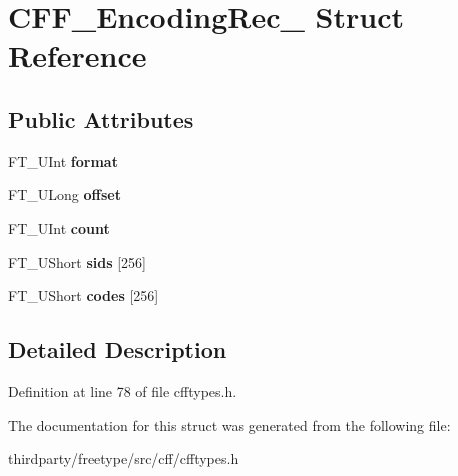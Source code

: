 \hypertarget{struct_c_f_f___encoding_rec__}{}\section{C\+F\+F\+\_\+\+Encoding\+Rec\+\_\+ Struct Reference}
\label{struct_c_f_f___encoding_rec__}
\subsection*{Public Attributes}
\begin{DoxyCompactItemize}
\item 
\mbox{\label{struct_c_f_f___encoding_rec___afa8daf27202e7173039d763587d99dff}} 
F\+T\+\_\+\+U\+Int {\bfseries format}
\item 
\mbox{\label{struct_c_f_f___encoding_rec___abd4c0f63590e61f684df1e811c56435e}} 
F\+T\+\_\+\+U\+Long {\bfseries offset}
\item 
\mbox{\label{struct_c_f_f___encoding_rec___aaa988f846f3d3b7615d5b05286e89d33}} 
F\+T\+\_\+\+U\+Int {\bfseries count}
\item 
\mbox{\label{struct_c_f_f___encoding_rec___a7a042b5015140ee3c81171ecf3167c35}} 
F\+T\+\_\+\+U\+Short {\bfseries sids} \mbox{[}256\mbox{]}
\item 
\mbox{\label{struct_c_f_f___encoding_rec___a995f129f6387cf1fe32dd7376c89b668}} 
F\+T\+\_\+\+U\+Short {\bfseries codes} \mbox{[}256\mbox{]}
\end{DoxyCompactItemize}


\subsection{Detailed Description}


Definition at line 78 of file cfftypes.\+h.



The documentation for this struct was generated from the following file\+:\begin{DoxyCompactItemize}
\item 
thirdparty/freetype/src/cff/cfftypes.\+h\end{DoxyCompactItemize}
